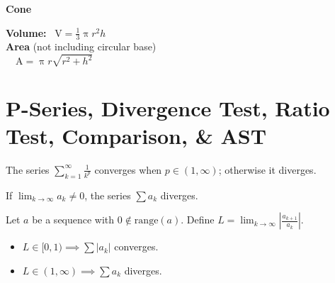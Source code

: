\documentclass[letterpaper,landscape,9pt,fleqn]{extarticle}
\newcommand{\range}{\mathrm{range}}
\begin{document}
\begin{multicols*}{2}
\noindent \textbf{Cone} \\
  \begin{minipage}[c]{0.25\textwidth}
  \end{minipage}
  \begin{minipage}[c]{0.25\textwidth}
  \noindent \textbf{Volume:} \,
  \(
     \mbox{V} = \frac{1}{3} \uppi r^2 h
  \) \\ 
  
\noindent \textbf{Area} (not including circular base) \, \\
\(
   \quad \mbox{A} =  \uppi r   \sqrt{r^2+h^2}
\) \\
\end{minipage}




\section*{P-Series, Divergence Test, Ratio Test, Comparison, \& AST}

\vspace{0.25in}
\begin{minipage}[c]{0.5\textwidth}
The series \(\sum_{k=1}^\infty \frac{1}{k^p}\) converges when $p \in (1,\infty)$;
otherwise it diverges.


If $\lim_{k \to \infty} a_k  \neq 0$, the series $\sum a_k$ diverges.


Let $a$ be a sequence with $0 \notin \range(a)$. Define 
$L = \lim_{k \to \infty} \left| \frac{a_{k+1}}{a_k} \right|$.
\begin{itemize}[noitemsep]
\item $L \in [0,1) \implies \sum |a_k| $ converges.
\item $L \in (1,\infty) \implies \sum a_k $ diverges.
\end{itemize}


\end{minipage}
\end{multicols*}
\end{document}
